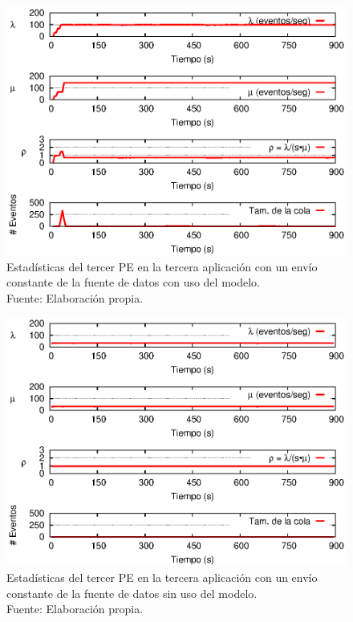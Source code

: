 \begin{figure}[!htp]
    \centering
    \captionsetup{justification=centering}
    \includegraphics[scale=1]{images/exp/app3/cm/logical/statusThreePE.eps}
    \caption[Estadísticas del tercer PE en la tercera aplicación con un envío constante de la fuente de datos con uso del modelo.]{Estadísticas del tercer PE en la tercera aplicación con un envío constante de la fuente de datos con uso del modelo.\\Fuente: Elaboración propia.}
    \label{fig:app3-statusThreePE-cm}
\end{figure}

\begin{figure}[!htp]
    \centering
    \captionsetup{justification=centering}
    \includegraphics[scale=1]{images/exp/app3/sm/logical/statusThreePE.eps}
    \caption[Estadísticas del tercer PE en la tercera aplicación con un envío constante de la fuente de datos sin uso del modelo.]{Estadísticas del tercer PE en la tercera aplicación con un envío constante de la fuente de datos sin uso del modelo.\\Fuente: Elaboración propia.}
    \label{fig:app3-statusThreePE-sm}
\end{figure}